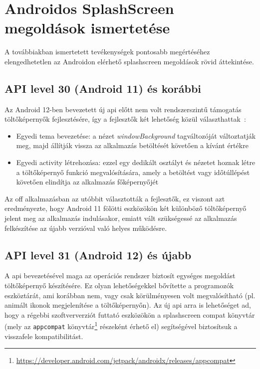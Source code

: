 \chapter{Androidos SplashScreen megoldások ismertetése}


A továbbiakban ismertetett tevékenységek pontosabb megértéséhez elengedhetetlen
az Androidon elérhető \gls{splashscreen} megoldások rövid áttekintése.

\section{API level 30 (Android 11) és korábbi}
Az Android 12-ben bevezetett új \acrshort{api} előtt nem volt rendszerszintű támogatás töltőképernyők
fejlesztésére, így a fejlesztők két lehetőség közül választhattak~\cite{splashscreenmigration}:
\begin{itemize}
 \item Egyedi \gls{tema} bevezetése: a nézet \textit{windowBackground} tagváltozóját változtatják meg,
 majd állítják vissza az alkalmazás betöltését követően a kívánt értékre
 \item Egyedi \Gls{activity} létrehozása: ezzel egy dedikált osztályt és nézetet hoznak létre
 a töltőképernyő funkció megvalósítására, amely a betöltést vagy időtúllépést követően elindítja
 az alkalmazás főképernyőjét
\end{itemize}

Az \acrlong{off} alkalmazásban az utóbbit választották a fejlesztők, ez viszont azt eredményezte,
hogy Android 11 fölötti eszközökön két különböző töltőképernyő jelent meg az alkalmazás indulásakor,
emiatt vált szükségessé az alkalmazás felkészítése az újabb verzióval való helyes működésre.

\section{API level 31 (Android 12) és újabb}
A  \acrshort{api} bevezetésével maga az operációs rendszer biztosít egységes megoldást
töltőképernyő készítésére. Ez olyan lehetőségekkel bővítette a programozók eszköztárát, ami korábban
nem, vagy csak körülményesen volt megvalósítható (pl. animált ikonok megjelenítése
a töltőképernyőn).
Az új \acrshort{api} arra is lehetőséget ad, hogy a régebbi szoftververziót futtató eszközökön a \gls{splashscreen}
compat könyvtár (mely az \texttt{\gls{appcompat}} könyvtár\footnote{\url{https://developer.android.com/jetpack/androidx/releases/appcompat}} részeként érhető el)
segítségével biztosítsuk a visszafele kompatibilitást.
